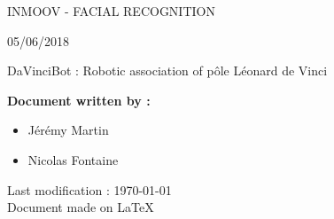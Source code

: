 \documentclass[12pt, oneside]{article}
\newcommand{\type}{05/06/2018}	%
\newcommand{\auteur}{\item Jérémy Martin
				      \item Nicolas Fontaine}	%
\newcommand{\titre}{InMoov - Facial Recognition}
\begin{document}
\renewcommand{\contentsname}{Table of Contents}
\pagestyle{style}

\begin{center}
\begin{minipage}{0.75\linewidth}
\begin{center}
\centering
   
\vspace{3cm}
\colorbox{gristitle}{
\begin{minipage}{\textwidth}
    \begin{center}
    	\vspace{0.5cm}
    	{\color{bleu} \uppercase{\Huge {\titre}}}
    	\vspace{0.25cm}\linebreak
		\par \color{gris} {\Large \type}	
	\end{center}    
\end{minipage}    
}

\vspace{2.5cm}

\color{bleu} {\Large DaVinciBot \color{gris} : Robotic association of pôle Léonard de Vinci  \par}
\end{center}

\vspace{1.5cm}
  
\color{gris} {\Large \textbf{Document written by :}
\large
\begin{addmargin}[1em]{1em}
    \begin{itemize}[label= , noitemsep]
    	\auteur
    \end{itemize}
\end{addmargin}}
    
\vspace{2.5cm}
\begin{center}
    {\large Last modification : \today \\ Document made on \LaTeX }
\end{center}
\end{minipage}
\end{center}

\newpage


\end{document}
